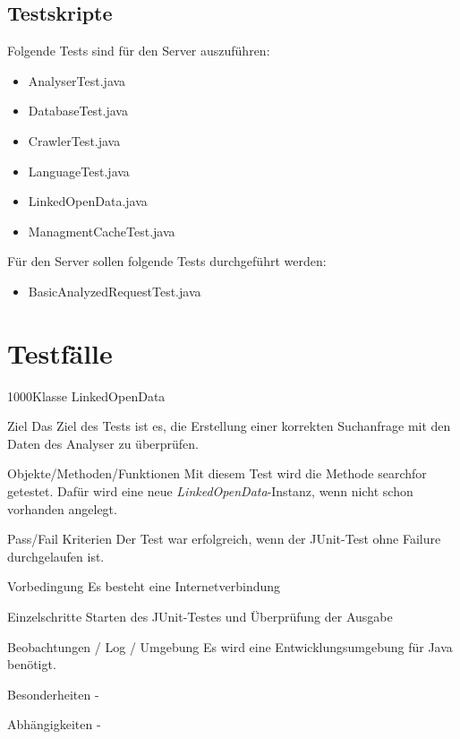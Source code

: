 \subsection{Testskripte}

Folgende Tests sind für den Server auszuführen:
\begin{itemize}
  \item AnalyserTest.java
  \item DatabaseTest.java
  \item CrawlerTest.java
  \item LanguageTest.java
  \item LinkedOpenData.java
  \item ManagmentCacheTest.java
\end{itemize}

Für den Server sollen folgende Tests durchgeführt werden:
\begin{itemize}
  \item BasicAnalyzedRequestTest.java
\end{itemize}


\section{Testfälle}

\begin{testcase}{1000}{Klasse LinkedOpenData}
\item[Ziel] Das Ziel des Tests ist es, die Erstellung einer korrekten
Suchanfrage mit den Daten des Analyser zu überprüfen.
\item[Objekte/Methoden/Funktionen] Mit diesem Test wird die Methode searchfor
getestet. Dafür wird eine neue \textit{LinkedOpenData}-Instanz, wenn nicht schon
vorhanden angelegt.
\item[Pass/Fail Kriterien] Der Test war erfolgreich, wenn der JUnit-Test ohne
Failure durchgelaufen ist.
\item[Vorbedingung] Es besteht eine Internetverbindung
\item[Einzelschritte] Starten des JUnit-Testes und Überprüfung der Ausgabe
\item[Beobachtungen / Log / Umgebung] Es wird eine Entwicklungsumgebung für Java
benötigt.
\item[Besonderheiten] -
\item[Abhängigkeiten] -
\end{testcase}

